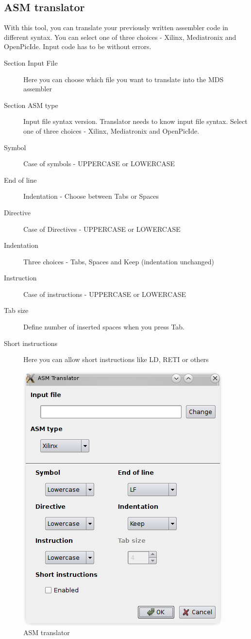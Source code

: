 \subsection{ASM translator}
    With this tool, you can translate your previously written assembler code in different syntax.
    You can select one of three choices - Xilinx, Mediatronix and OpenPicIde. Input code has to be without
    errors.
    \begin{description}
        \item[Section Input File] Here you can choose which file you want to translate into the MDS assembler
        \item[Section ASM type] Input file syntax version. Translator needs to know input file syntax. Select one of
             three choices - Xilinx, Mediatronix and OpenPicIde.
        \item[Symbol] Case of symbols - UPPERCASE or LOWERCASE
        \item[End of line] Indentation - Choose between Tabs or Spaces
        \item[Directive] Case of Directives - UPPERCASE or LOWERCASE
        \item[Indentation] Three choices - Tabs, Spaces and Keep (indentation unchanged)
        \item[Instruction] Case of instructions - UPPERCASE or LOWERCASE
        \item[Tab size]  Define number of inserted spaces when you press Tab.
        \item[Short instructions] Here you can allow short instructions like LD, RETI or others
    \end{description}

    \begin{figure}[h]
        \centering{}
        \includegraphics[width=.5\textwidth]{img/ASM_translator.png}
        \caption{ASM translator}
    \end{figure}

